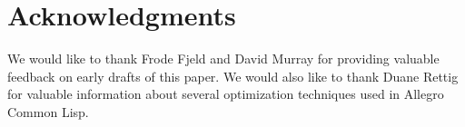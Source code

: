 \section{Acknowledgments} 

We would like to thank Frode Fjeld and David Murray for providing
valuable feedback on early drafts of this paper.  We would also like
to thank Duane Rettig for valuable information about several
optimization techniques used in Allegro Common Lisp.
